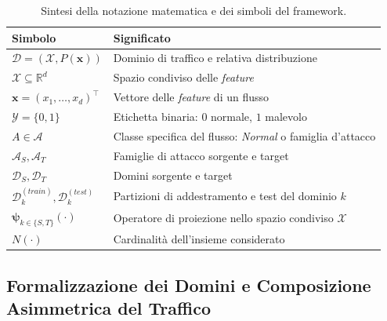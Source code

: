 \begin{table}[H]
    \centering
    \small
    \caption{Sintesi della notazione matematica e dei simboli del framework.}
    \label{tab:notazione_matematica}
    \begin{tabularx}{\textwidth}{
        >{\raggedright\arraybackslash}p{3cm}
        >{\raggedright\arraybackslash}X
    }
        \toprule
        \textbf{Simbolo} & \textbf{Significato} \\
        \midrule

        $\mathcal{D} = (\mathcal{X}, P(\mathbf{x}))$ &
        Dominio di traffico e relativa distribuzione \\

        $\mathcal{X} \subseteq \mathbb{R}^d$ &
        Spazio condiviso delle \textit{feature} \\

        $\mathbf{x} = (x_1, \dots, x_d)^\top$ &
        Vettore delle \textit{feature} di un flusso \\

        $\mathcal{Y} = \{0,1\}$ &
        Etichetta binaria: $0$ normale, $1$ malevolo \\

        $A \in \mathcal{A}$ &
        Classe specifica del flusso: \textit{Normal} o famiglia d'attacco \\

        $\mathcal{A}_S, \mathcal{A}_T$ &
        Famiglie di attacco sorgente e target \\

        $\mathcal{D}_S, \mathcal{D}_T$ &
        Domini sorgente e target \\

        $\mathcal{D}_k^{(train)}, \mathcal{D}_k^{(test)}$ &
        Partizioni di addestramento e test del dominio $k$ \\

        $\boldsymbol{\psi}_{k \in \{S,T\}}(\cdot)$ &
        Operatore di proiezione nello spazio condiviso $\mathcal{X}$ \\

        $N(\cdot)$ &
        Cardinalità dell'insieme considerato \\

        \bottomrule
    \end{tabularx}
\end{table}

\subsection{Formalizzazione dei Domini e Composizione Asimmetrica del Traffico}
\label{subsec:composizione_domini}

